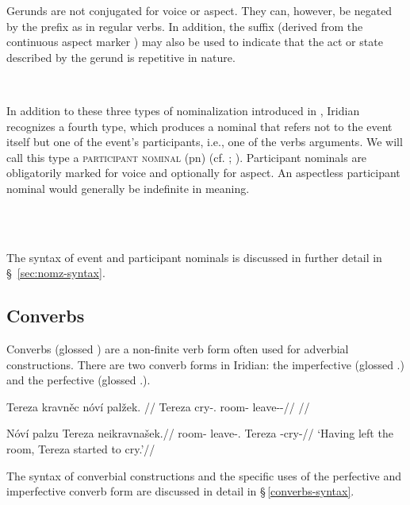 Gerunds are not conjugated for voice or aspect. They can, however, be negated by
the prefix  as in regular verbs. In addition, the suffix 
(derived from the continuous aspect marker ) may also be used to
indicate that the act or state described by the gerund is repetitive in nature.

\pex    {}\\
\xe

In addition to these three types of nominalization introduced in
\textcite{grimshaw1990}, Iridian recognizes a fourth type, which produces a
nominal that refers not to the event itself but one of the event's participants,
i.e., one of the verbs arguments. We will call this type a {\scshape participant
nominal} ({\sc pn}) (cf. \cite[400-5]{schackow2015}; \cite[297-8]{okuna}).
Participant nominals are obligatorily marked for voice and optionally for
aspect. An aspectless participant nominal would generally be indefinite in
meaning.

\pex	{}\\
		\\
\xe

The syntax of event and participant nominals is discussed in further detail in
\S~\ref{sec:nomz-syntax}.

\subsection{Converbs}\label{sec:converb}

Converbs (glossed \Cv{}) are a non-finite verb form often used for adverbial
constructions. There are two converb forms in Iridian: the imperfective
 (glossed \Cv{}.\Ipf{}) and the perfective
 (glossed \Cv{}.\Pf{}).

\pex
\begingl
\gla Tereza kravněc nóví palžek. //
\glb Tereza cry-\Cv{}.\Ipf{} room-\Gen{} leave-\Av{}-\Pf{}//
\glft {}//
\endgl
\xe

\pex
\begingl
\gla Nóví palzu Tereza neikravnašek.//
\glb room-\Gen{} leave-\Cv{}.\Pf{} Tereza -cry-//
\glft `Having left the room, Tereza started to cry.'//
\endgl
\xe

The syntax of converbial constructions and the specific uses of the perfective
and imperfective converb form are discussed in detail in
\S\,\ref{converbs-syntax}.


